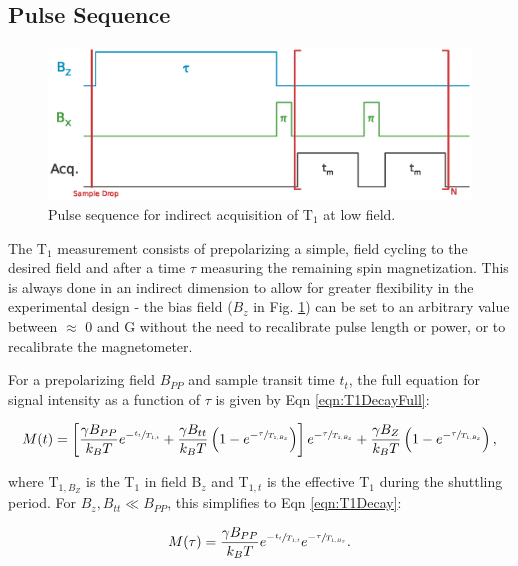 \documentclass[PaulGanssle-Thesis.tex]{subfiles}
\begin{document}
\subsection{Pulse Sequence}
\label{Section:Relaxometry-T1-PulseSequence}
\begin{figure}[ht!]
\includegraphics[width=\tw]{figures/relaxometry/t1_sequence_diagram.eps}
\caption{Pulse sequence for indirect acquisition of $\mathrm{T}_{1}$ at low field.}
\label{fig:relaxometry.t1.pulsesequence}
\end{figure}

The $\mathrm{T}_{1}$ measurement consists of prepolarizing a simple, field cycling to the desired field and after a time $\tau$ measuring the remaining spin magnetization. This is always done in an indirect dimension to allow for greater flexibility in the experimental design - the bias field ($B_z$ in Fig. \ref{fig:relaxometry.t1.pulsesequence}) can be set to an arbitrary value between $\approx$ 0 and \unit[1]{G} without the need to recalibrate pulse length or power, or to recalibrate the magnetometer.

For a prepolarizing field $B_{PP}$ and sample transit time $t_t$, the full equation for signal intensity as a function of $\tau$ is given by Eqn \ref{eqn:T1DecayFull}:

\begin{equation}
M(t) = \left[\frac{\gamma B_{PP}}{k_{B}T}e^{-\sfrac{t_t}{T_{1,t}}} + \frac{\gamma B_{tt}}{k_{B}T}\left(1-e^{-\sfrac{\tau}{T_{1,B_{Z}}}}\right)\right]e^{-\sfrac{\tau}{T_{1,B_{Z}}}} + \frac{\gamma B_{Z}}{k_{B}T}\left(1-e^{-\sfrac{\tau}{T_{1,B_{Z}}}}\right),
\label{eqn:T1DecayFull}
\end{equation}

where $\mathrm{T}_{1,B_{Z}}$ is the T$_1$ in field B$_{z}$ and T$_{1,t}$ is the effective T$_{1}$ during the shuttling period. For $B_{z}, B_{tt} \ll B_{PP}$, this simplifies to Eqn \ref{eqn:T1Decay}:

\begin{equation}
\label{eqn:T1Decay}
M(\tau) = \frac{\gamma B_{PP}}{k_{B}T}e^{-\sfrac{t_t}{T_{1,t}}}e^{-\sfrac{\tau}{T_{1,B_{Z}}}}.
\end{equation}
\end{document}

